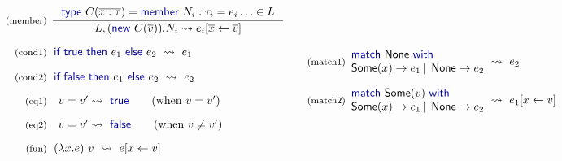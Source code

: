 \documentclass[10pt,nocopyrightspace]{sigplanconf}
\newcommand{\kvd}[1]{\textnormal{\textcolor{kvdclr}{\sffamily #1}}}
\newcommand{\ident}[1]{\textnormal{\sffamily #1}}
\newcommand{\reduce}{\rightsquigarrow}
\begin{document}
\begin{figure*}
\vspace{0.5em}
\noindent
\begin{equation*}
\begin{array}{rl}
 \textnormal{\footnotesize{(member)}}&
 \hspace{-0.6em}
 \inference
 { \kvd{type}~C(\overline{x:\tau})= \kvd{member}~N_i : \tau_i = e_i \ldots \in L }
 { L, (\kvd{new}~C(\overline{v})).N_i \reduce e_i[\overline{x} \leftarrow \overline{v}] }\\
 \\[-0.2em]
 \textnormal{\footnotesize{(cond1)}}&
 \hspace{-0.4em}
 \kvd{if}~\kvd{true}~\kvd{then}~e_1~\kvd{else}~e_2 ~\reduce~ e_1 \\
 \\[-0.2em]
 \textnormal{\footnotesize{(cond2)}}&
 \hspace{-0.4em}
 \kvd{if}~\kvd{false}~\kvd{then}~e_1~\kvd{else}~e_2 ~\reduce~ e_2 \\
 \\[-0.3em]
 \textnormal{\footnotesize{(eq1)}}&
 v=v'\reduce\kvd{true} \qquad (\textnormal{when}~v = v')\\
 \\[-0.3em]
 \textnormal{\footnotesize{(eq2)}}&
 v=v'\reduce\kvd{false} \qquad (\textnormal{when}~v \neq v')\\
 \\[-0.3em]
 \textnormal{\footnotesize{(fun)}}&
 \hspace{-0.4em}
 (\lambda x.e)~v ~\reduce~ e[x\leftarrow v] \\
\end{array}
\quad
\begin{array}{rl}
 \textnormal{\footnotesize{(match1)}}&
 \hspace{-1em}
 \begin{array}{l}
  \kvd{match}~\ident{None}~\kvd{with} \\
  \ident{Some}(x) \rightarrow e_1 \,|\, \ident{None} \rightarrow e_2
 \end{array} \hspace{-0.5em} ~\reduce~ e_2 \\
 \\[-0.2em]
 \textnormal{\footnotesize{(match2)}}&
 \hspace{-1em}
 \begin{array}{l}
    \kvd{match}~\ident{Some}(v)~\kvd{with} \\
    \ident{Some}(x) \rightarrow e_1 \,|\, \ident{None} \rightarrow e_2
 \end{array} \hspace{-0.5em} ~\reduce~ e_1[x\leftarrow v]\\

\end{array}
\end{equation*}
\end{figure*}
\end{document}
